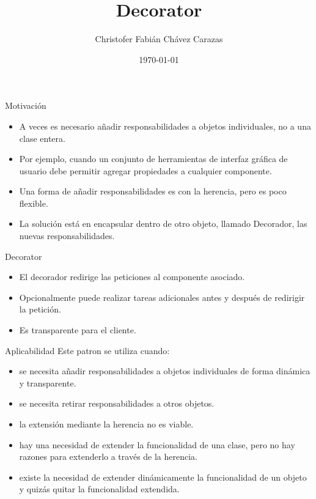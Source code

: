 \documentclass{beamer}
\title{Decorator}
\author{Christofer Fabián Chávez Carazas}
\institute{Universidad Nacional de San Agustín}
\date{\today}
\begin{document}
 
 \begin{frame}
  \titlepage
 \end{frame}

\begin{frame}{Motivación}
  \begin{itemize}
  \item A veces es necesario añadir responsabilidades a objetos individuales, no a una clase entera.
  \item Por ejemplo, cuando un conjunto de herramientas de interfaz gráfica de usuario debe permitir agregar propiedades a cualquier componente.
  \item Una forma de añadir responsabilidades es con la herencia, pero es poco flexible.
  \item La solución está en encapsular dentro de otro objeto, llamado Decorador, las nuevas responsabilidades.
  \end{itemize}
\end{frame}

\begin{frame}{Decorator}
 \begin{itemize}
  \item El decorador redirige las peticiones al componente asociado.
  \item Opcionalmente puede realizar tareas adicionales antes y después de redirigir la petición.
  \item Es transparente para el cliente.
 \end{itemize}
\end{frame}

\begin{frame}{Aplicabilidad}
Este patron se utiliza cuando:
 \begin{itemize}  
    \item se necesita añadir responsabilidades a objetos individuales de forma dinámica y transparente.
    \item se necesita retirar responsabilidades a otros objetos.
    \item la extensión mediante la herencia no es viable.
    \item hay una necesidad de extender la funcionalidad de una clase, pero no hay razones para extenderlo a través de la herencia.
    \item existe la necesidad de extender dinámicamente la funcionalidad de un objeto y quizás quitar la funcionalidad extendida.
 \end{itemize}
\end{frame}
\end{document}

